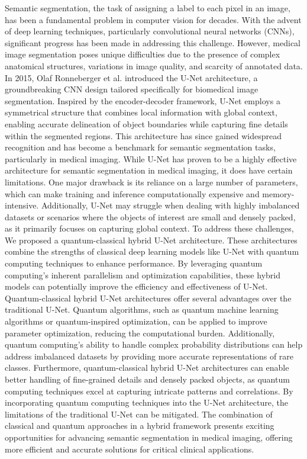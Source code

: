 \documentclass[conference]{IEEEtran}
\begin{document}
Semantic segmentation, the task of assigning a label to each pixel in an image, has been a fundamental problem in computer vision for decades. With the advent of deep learning techniques, particularly convolutional neural networks (CNNs), significant progress has been made in addressing this challenge. However, medical image segmentation poses unique difficulties due to the presence of complex anatomical structures, variations in image quality, and scarcity of annotated data.
In 2015, Olaf Ronneberger et al. introduced the U-Net architecture, a groundbreaking CNN design tailored specifically for biomedical image segmentation. Inspired by the encoder-decoder framework, U-Net employs a symmetrical structure that combines local information with global context, enabling accurate delineation of object boundaries while capturing fine details within the segmented regions. This architecture has since gained widespread recognition and has become a benchmark for semantic segmentation tasks, particularly in medical imaging. 
While U-Net has proven to be a highly effective architecture for semantic segmentation in medical imaging, it does have certain limitations. One major drawback is its reliance on a large number of parameters, which can make training and inference computationally expensive and memory-intensive. %
Additionally, U-Net may struggle when dealing with highly imbalanced datasets or scenarios where the objects of interest are small and densely packed, as it primarily focuses on capturing global context.
To address these challenges, We proposed a quantum-classical hybrid U-Net architecture. These architectures combine the strengths of classical deep learning models like U-Net with quantum computing techniques to enhance performance. By leveraging quantum computing's inherent parallelism and optimization capabilities, these hybrid models can potentially improve the efficiency and effectiveness of U-Net.
Quantum-classical hybrid U-Net architectures offer several advantages over the traditional U-Net. Quantum algorithms, such as quantum machine learning algorithms or quantum-inspired optimization, can be applied to improve parameter optimization, reducing the computational burden. Additionally, quantum computing's ability to handle complex probability distributions can help address imbalanced datasets by providing more accurate representations of rare classes. Furthermore, quantum-classical hybrid U-Net architectures can enable better handling of fine-grained details and densely packed objects, as quantum computing techniques excel at capturing intricate patterns and correlations.
By incorporating quantum computing techniques into the U-Net architecture, the limitations of the traditional U-Net can be mitigated. The combination of classical and quantum approaches in a hybrid framework presents exciting opportunities for advancing semantic segmentation in medical imaging, offering more efficient and accurate solutions for critical clinical applications. 
\end{document}
